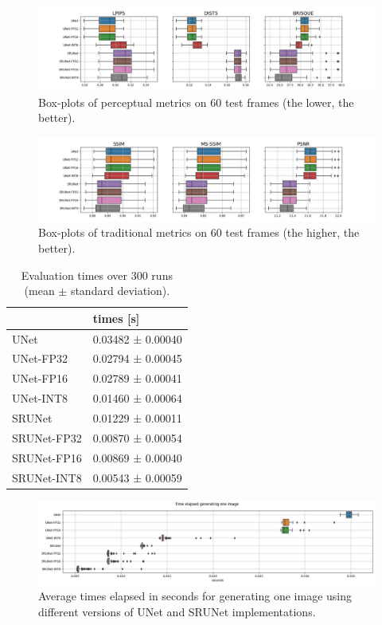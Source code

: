\begin{figure}[ht]
\includegraphics[width=1.0\textwidth]{static/boxplots_perceptual_metrics.jpg}
\caption{Box-plots of perceptual metrics on 60 test frames (the lower, the better).}
\label{fig:perceptual-metrics}
\end{figure}

\begin{figure}[ht]
\includegraphics[width=1.0\textwidth]{static/boxplots_traditional_metrics.jpg}
\caption{Box-plots of traditional metrics on 60 test frames (the higher, the better).}
\label{fig:traditional-metrics}
\end{figure}

\begin{table}[t]
\begin{tabular}{ll}
\toprule
{} &      times [s] \\
\midrule
UNet        &  0.03482 ± 0.00040 \\
UNet-FP32   &  0.02794 ± 0.00045 \\
UNet-FP16   &  0.02789 ± 0.00041 \\
UNet-INT8   &  0.01460 ± 0.00064 \\
\midrule
SRUNet      &  0.01229 ± 0.00011 \\
SRUNet-FP32 &  0.00870 ± 0.00054 \\
SRUNet-FP16 &  0.00869 ± 0.00040 \\
SRUNet-INT8 &  0.00543 ± 0.00059 \\
\bottomrule
\end{tabular}
\caption{Evaluation times over 300 runs (mean $\pm$ standard deviation).}
\label{tab:timings}
\end{table}

\begin{figure}[ht]
\includegraphics[width=1.0\textwidth]{static/boxplots_timings.jpg}
\caption{Average times elapsed in seconds for generating one image using different versions of UNet and SRUNet implementations.}
\label{fig:timings}
\end{figure}

